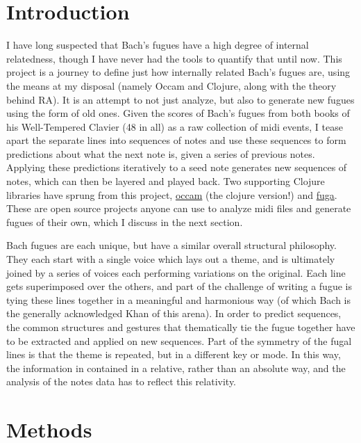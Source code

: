 \documentclass[11pt]{article}
\begin{document}
\maketitle

\section{Introduction}

I have long suspected that Bach's fugues have a high degree of internal relatedness, though I have never had the tools to quantify that until now.  This project is a journey to define just how internally related Bach's fugues are, using the means at my disposal (namely Occam and Clojure, along with the theory behind RA).  It is an attempt to not just analyze, but also to generate new fugues using the form of old ones.  Given the scores of Bach's fugues from both books of his Well-Tempered Clavier (48 in all) as a raw collection of midi events, I tease apart the separate lines into sequences of notes and use these sequences to form predictions about what the next note is, given a series of previous notes.  Applying these predictions iteratively to a seed note generates new sequences of notes, which can then be layered and played back.  Two supporting Clojure libraries have sprung from this project, \href{http://github.com/prismofeverything/occam}{occam} (the clojure version!) and \href{http://github.com/prismofeverything/fuga}{fuga}.  These are open source projects anyone can use to analyze midi files and generate fugues of their own, which I discuss in the next section.  

Bach fugues are each unique, but have a similar overall structural philosophy.  They each start with a single voice which lays out a theme, and is ultimately joined by a series of voices each performing variations on the original.  Each line gets superimposed over the others, and part of the challenge of writing a fugue is tying these lines together in a meaningful and harmonious way (of which Bach is the generally acknowledged Khan of this arena).  In order to predict sequences, the common structures and gestures that thematically tie the fugue together have to be extracted and applied on new sequences.  Part of the symmetry of the fugal lines is that the theme is repeated, but in a different key or mode.  In this way, the information in contained in a relative, rather than an absolute way, and the analysis of the notes data has to reflect this relativity.

\section{Methods}
\end{document}
